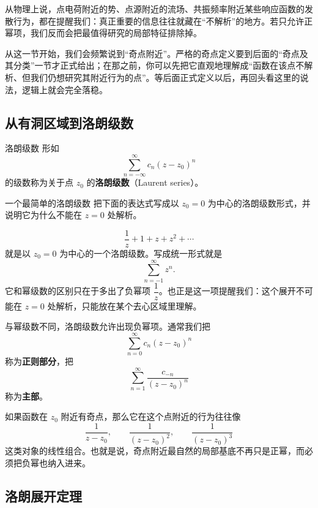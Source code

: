 从物理上说，点电荷附近的势、点源附近的流场、共振频率附近某些响应函数的发散行为，都在提醒我们：真正重要的信息往往就藏在``不解析''的地方。若只允许正幂项，我们反而会把最值得研究的局部特征排除掉。

\begin{tishi}
从这一节开始，我们会频繁说到``奇点附近''。严格的奇点定义要到后面的``奇点及其分类''一节才正式给出；在那之前，你可以先把它直观地理解成``函数在该点不解析、但我们仍想研究其附近行为的点''。等后面正式定义以后，再回头看这里的说法，逻辑上就会完全落稳。
\end{tishi}

\subsection{从有洞区域到洛朗级数}

\begin{dingliyi}{洛朗级数}{}
形如
\[
    \sum_{n=-\infty}^{\infty} c_n (z-z_0)^n
\]
的级数称为关于点 $z_0$ 的\textbf{洛朗级数}（Laurent series）。
\end{dingliyi}

\begin{lizi}{一个最简单的洛朗级数}{}
把下面的表达式写成以 $z_0=0$ 为中心的洛朗级数形式，并说明它为什么不能在 $z=0$ 处解析。

\begin{jie}
\[
    \frac{1}{z}+1+z+z^2+\cdots
\]
就是以 $z_0=0$ 为中心的一个洛朗级数。写成统一形式就是
\[
    \sum_{n=-1}^{\infty} z^n.
\]
它和幂级数的区别只在于多出了负幂项 $\dfrac{1}{z}$。也正是这一项提醒我们：这个展开不可能在 $z=0$ 处解析，只能放在某个去心区域里理解。
\end{jie}
\end{lizi}

与幂级数不同，洛朗级数允许出现负幂项。通常我们把
\[
    \sum_{n=0}^{\infty} c_n (z-z_0)^n
\]
称为\textbf{正则部分}，把
\[
    \sum_{n=1}^{\infty} \frac{c_{-n}}{(z-z_0)^n}
\]
称为\textbf{主部}。

\begin{tishi}[为什么会出现负幂项]
如果函数在 $z_0$ 附近有奇点，那么它在这个点附近的行为往往像
\[
    \frac{1}{z-z_0},\qquad \frac{1}{(z-z_0)^2},\qquad \frac{1}{(z-z_0)^3}
\]
这类对象的线性组合。也就是说，奇点附近最自然的局部基底不再只是正幂，而必须把负幂也纳入进来。
\end{tishi}

\subsection{洛朗展开定理}

